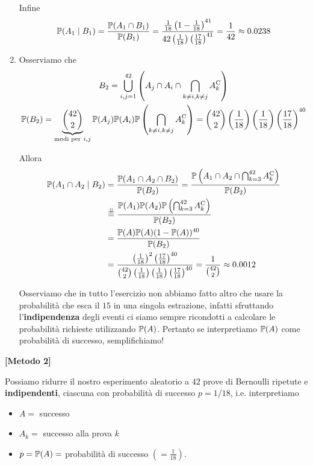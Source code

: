 \begin{enumerate}
Infine
\begin{equation*}
\mathbb{P}( A_{1} \mid B_{1}) =\frac{\mathbb{P}( A_{1} \cap B_{1})}{\mathbb{P}( B_{1})} =\frac{\frac{1}{18}\left( 1-\frac{1}{18}\right)^{41}}{42\left(\frac{1}{18}\right)\left(\frac{17}{18}\right)^{41}} =\frac{1}{42} \approx 0.0238
\end{equation*}
\item Osserviamo che
\begin{gather*}
B_{2} =\bigcup _{i,j=1}^{42}\left( A_{j} \cap A_{i} \cap \bigcap _{k\neq i,k\neq j} A_{k}^{\mathrm{C}}\right)\\
\mathbb{P}( B_{2}) =\underbrace{\binom{42}{2}}_{\text{modi per} \ i,j}\mathbb{P}( A_{j})\mathbb{P}( A_{i})\mathbb{P}\left(\bigcap _{k\neq i,k\neq j} A_{k}^{\mathrm{C}}\right) =\binom{42}{2}\left(\frac{1}{18}\right)\left(\frac{1}{18}\right)\left(\frac{17}{18}\right)^{40}
\end{gather*}

Allora
\begin{align*}
\mathbb{P}( A_{1} \cap A_{2} \mid B_{2}) & =\frac{\mathbb{P}( A_{1} \cap A_{2} \cap B_{2})}{\mathbb{P}( B_{2})} =\frac{\mathbb{P}\left( A_{1} \cap A_{2} \cap \bigcap _{k=3}^{42} A_{k}^{\mathrm{C}}\right)}{\mathbb{P}( B_{2})}\\
 & \overset{\perp \!\!\! \perp }{=}\frac{\mathbb{P}( A_{1})\mathbb{P}( A_{2})\mathbb{P}\left(\bigcap _{k=3}^{42} A_{k}^{\mathrm{C}}\right)}{\mathbb{P}( B_{2})}\\
 & =\frac{\mathbb{P}( A)\mathbb{P}( A)( 1-\mathbb{P}( A))^{40}}{\mathbb{P}( B_{2})}\\
 & =\frac{\left(\frac{1}{18}\right)^{2}\left(\frac{17}{18}\right)^{40}}{\binom{42}{2}\left(\frac{1}{18}\right)\left(\frac{1}{18}\right)\left(\frac{17}{18}\right)^{40}} =\frac{1}{\binom{42}{2}} \approx 0.0012
\end{align*}

\begin{oss}
Osserviamo che in tutto l'esercizio non abbiamo fatto altro che usare la probabilità che esca il $15$ in una singola estrazione, infatti sfruttando l'\textbf{indipendenza} degli eventi ci siamo sempre ricondotti a calcolare le probabilità richieste utilizzando $\mathbb{P}( A)$. Pertanto se interpretiamo $\mathbb{P}( A)$ come probabilità di successo, semplifichiamo!
\end{oss}
\end{enumerate}
\textbf{[Metodo 2]}

Possiamo ridurre il nostro esperimento aleatorio a $42$ prove di Bernoulli ripetute e \textbf{indipendenti}, ciascuna con probabilità di successo $p=1/18$, i.e. interpretiamo
\begin{itemize}
\item $A=$ successo
\item $A_{k} =$ successo alla prova $k$
\item $p=\mathbb{P}( A) =$ probabilità di successo $\left( =\frac{1}{18}\right)$.
\end{itemize}


